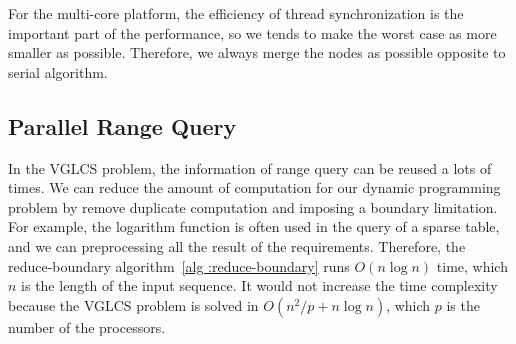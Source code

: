 


For the multi-core platform, the efficiency of thread synchronization is
the important part of the performance, so we tends to make the worst
case as more smaller as possible.  Therefore, we always merge the nodes
as possible opposite to serial algorithm.



\iffalse
在單一處理器下，由於動態規劃常會遇到不合定義而填入連續的 0，
多次的插入操作可以直到下一個非零的時候再進行，同時也改善查表的花費，
直到下一個非零的才進行的操作，增加嚴重增加某一次操作的時間。

在多核心平台下，要避免單一操作時間過長，一旦單一操作時間過長，
多個工作的同步將變得非常沒有效率。因此，每一次操作都強制合併，這有別於循序算法的版本。
\fi

\subsection{Parallel Range Query}


In the VGLCS problem, the information of range query can be reused a
lots of times.  We can reduce the amount of computation for our dynamic
programming problem by remove duplicate computation and imposing a
boundary limitation.  For example, the logarithm function is often used
in the query of a sparse table, and we can preprocessing all the result
of the requirements.  Therefore, the reduce-boundary algorithm~\ref{alg
:reduce-boundary} runs $O(n \log n)$ time, which $n$  is the length of
the input sequence.  It would not increase the time complexity because
the VGLCS problem is solved in  $O(n^2 / p + n \log n)$, which $p$ is
the number of the processors.


\iffalse
運行區間查找時，一般依賴內建函數在 $O(1)$ 時間完成對數取整，
然而，在 VGLCS 這類型的動態規劃中，區間查找的對數結果是可以被預測的，預先將每一組詢問的區段對數結果儲存在陣列中，便可降低指令次數。
\fi

\iffalse
由於已知所有詢問區間，建立稀疏表時，可藉由動態規劃在 $O(n \log n)$ 排除掉不可能的計算 (參照算法 ~\ref{alg:reduce-boundary})，
降低過程中的計算量。由於 VGLCS 在平行操作需要 $O(n \log n)$，故使用動態規劃不影響我們的最終結果。
\fi

